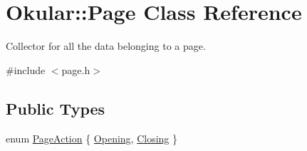 \hypertarget{classOkular_1_1Page}{\section{Okular\+:\+:Page Class Reference}
\label{classOkular_1_1Page}
}


Collector for all the data belonging to a page.  




{\ttfamily \#include $<$page.\+h$>$}

\subsection*{Public Types}
\begin{DoxyCompactItemize}
\item 
enum \hyperlink{classOkular_1_1Page_a6a8e241cdb604d5c90d5f80b169788f7}{Page\+Action} \{ \hyperlink{classOkular_1_1Page_a6a8e241cdb604d5c90d5f80b169788f7adbcb6b79c0b2118ed23a0d1c89391f87}{Opening}, 
\hyperlink{classOkular_1_1Page_a6a8e241cdb604d5c90d5f80b169788f7ae9b42d3ddb97cc7f889104c73c686f80}{Closing}
 \}
\end{DoxyCompactItemize}
